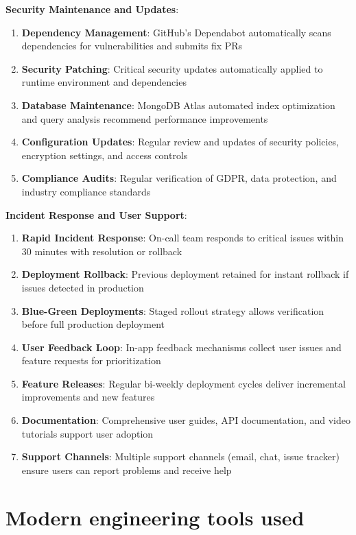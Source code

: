 \documentclass[12pt,a4paper]{report}
\begin{document}
\textbf{Security Maintenance and Updates}:
\begin{enumerate}[label=\roman*)]
    \item \textbf{Dependency Management}: GitHub's Dependabot automatically scans dependencies for vulnerabilities and submits fix PRs
    \item \textbf{Security Patching}: Critical security updates automatically applied to runtime environment and dependencies
    \item \textbf{Database Maintenance}: MongoDB Atlas automated index optimization and query analysis recommend performance improvements
    \item \textbf{Configuration Updates}: Regular review and updates of security policies, encryption settings, and access controls
    \item \textbf{Compliance Audits}: Regular verification of GDPR, data protection, and industry compliance standards
\end{enumerate}

\textbf{Incident Response and User Support}:
\begin{enumerate}[label=\roman*)]
    \item \textbf{Rapid Incident Response}: On-call team responds to critical issues within 30 minutes with resolution or rollback
    \item \textbf{Deployment Rollback}: Previous deployment retained for instant rollback if issues detected in production
    \item \textbf{Blue-Green Deployments}: Staged rollout strategy allows verification before full production deployment
    \item \textbf{User Feedback Loop}: In-app feedback mechanisms collect user issues and feature requests for prioritization
    \item \textbf{Feature Releases}: Regular bi-weekly deployment cycles deliver incremental improvements and new features
    \item \textbf{Documentation}: Comprehensive user guides, API documentation, and video tutorials support user adoption
    \item \textbf{Support Channels}: Multiple support channels (email, chat, issue tracker) ensure users can report problems and receive help
\end{enumerate}

\newpage

\chapter{Modern engineering tools used}
\end{document}

